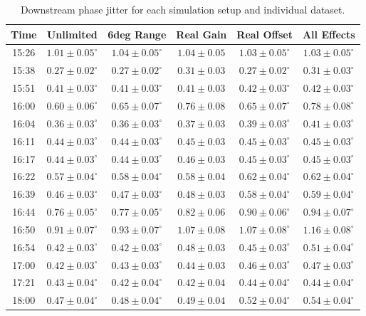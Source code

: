 \begin{table}
  \begin{center}
    \begin{tabular}{| c  c  c  c  c  c |}
	   \hline
       Time & Unlimited &  6deg Range &  Real Gain &  Real Offset &  All Effects \\ \hline
15:26 & \(1.01\pm0.05^\circ\) & \(1.04\pm0.05^\circ\) & \(1.04\pm0.05\) & \(1.03\pm0.05^\circ\) & \(1.03\pm0.05^\circ\) \\
15:38 & \(0.27\pm0.02^\circ\) & \(0.27\pm0.02^\circ\) & \(0.31\pm0.03\) & \(0.27\pm0.02^\circ\) & \(0.31\pm0.03^\circ\) \\
15:51 & \(0.41\pm0.03^\circ\) & \(0.41\pm0.03^\circ\) & \(0.41\pm0.03\) & \(0.42\pm0.03^\circ\) & \(0.42\pm0.03^\circ\) \\
16:00 & \(0.60\pm0.06^\circ\) & \(0.65\pm0.07^\circ\) & \(0.76\pm0.08\) & \(0.65\pm0.07^\circ\) & \(0.78\pm0.08^\circ\) \\
16:04 & \(0.36\pm0.03^\circ\) & \(0.36\pm0.03^\circ\) & \(0.37\pm0.03\) & \(0.39\pm0.03^\circ\) & \(0.41\pm0.03^\circ\) \\
16:11 & \(0.44\pm0.03^\circ\) & \(0.44\pm0.03^\circ\) & \(0.45\pm0.03\) & \(0.45\pm0.03^\circ\) & \(0.45\pm0.03^\circ\) \\
16:17 & \(0.44\pm0.03^\circ\) & \(0.44\pm0.03^\circ\) & \(0.46\pm0.03\) & \(0.45\pm0.03^\circ\) & \(0.45\pm0.03^\circ\) \\
16:22 & \(0.57\pm0.04^\circ\) & \(0.58\pm0.04^\circ\) & \(0.58\pm0.04\) & \(0.62\pm0.04^\circ\) & \(0.62\pm0.04^\circ\) \\
16:39 & \(0.46\pm0.03^\circ\) & \(0.47\pm0.03^\circ\) & \(0.48\pm0.03\) & \(0.58\pm0.04^\circ\) & \(0.59\pm0.04^\circ\) \\
16:44 & \(0.76\pm0.05^\circ\) & \(0.77\pm0.05^\circ\) & \(0.82\pm0.06\) & \(0.90\pm0.06^\circ\) & \(0.94\pm0.07^\circ\) \\
16:50 & \(0.91\pm0.07^\circ\) & \(0.93\pm0.07^\circ\) & \(1.07\pm0.08\) & \(1.07\pm0.08^\circ\) & \(1.16\pm0.08^\circ\) \\
16:54 & \(0.42\pm0.03^\circ\) & \(0.42\pm0.03^\circ\) & \(0.48\pm0.03\) & \(0.45\pm0.03^\circ\) & \(0.51\pm0.04^\circ\) \\
17:00 & \(0.42\pm0.03^\circ\) & \(0.43\pm0.03^\circ\) & \(0.44\pm0.03\) & \(0.46\pm0.03^\circ\) & \(0.47\pm0.03^\circ\) \\
17:21 & \(0.43\pm0.04^\circ\) & \(0.42\pm0.04^\circ\) & \(0.42\pm0.04\) & \(0.44\pm0.04^\circ\) & \(0.44\pm0.04^\circ\) \\
18:00 & \(0.47\pm0.04^\circ\) & \(0.48\pm0.04^\circ\) & \(0.49\pm0.04\) & \(0.52\pm0.04^\circ\) & \(0.54\pm0.04^\circ\) \\ \hline
    \end{tabular}
    \caption{Downstream phase jitter for each simulation setup and individual dataset.}
  	\label{t:LongFFIndivSim}
  \end{center}
\end{table}


